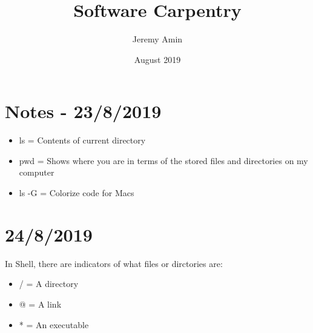 \documentclass{article}
\title{Software Carpentry}
\author{Jeremy Amin}
\date{August 2019}
\begin{document}
\maketitle

\section{Notes - 23/8/2019}

\begin{itemize}
    \item ls = Contents of current directory
    \item pwd = Shows where you are in terms of the stored files and directories on my computer
    \item ls -G = Colorize code for Macs
\end{itemize}

\section{24/8/2019}
In Shell, there are indicators of what files or dirctories are:
\begin{itemize}
\item / = A directory
\item @ = A link
\item * = An executable
\end{itemize}
\end{document}
